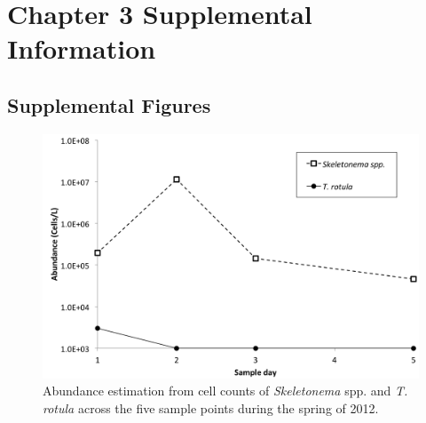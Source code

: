 


\chapter{Chapter 3 Supplemental Information}
\label{sec:app3}
\clearpage
\section{Supplemental Figures}

\begin{figure}[h!]
  \centering
    \includegraphics[width=1\textwidth]{Images/C3_SFigure1_CellCounts.png}
    \caption[Cell counts in Narragansett Bay during the spring of 2012]{Abundance estimation from cell counts of \textit{Skeletonema} spp. and \textit{T. rotula} across the five sample points during the spring of 2012. }
  \label{fig:a3f1}
\end{figure}


